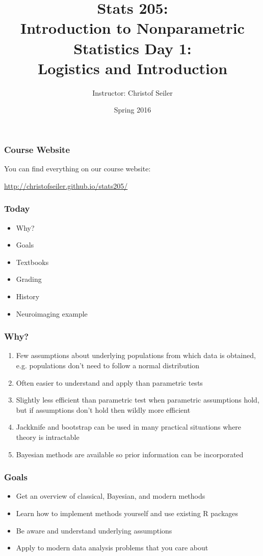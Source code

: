 \documentclass[10pt]{beamer}
\title{\large \bfseries Stats 205: \\ Introduction to Nonparametric Statistics \linebreak \linebreak \linebreak
Day 1: \\ Logistics and Introduction}
\author{Instructor: Christof Seiler}
\date{Spring 2016}
\begin{document}
\frame{
\thispagestyle{empty}
\titlepage
}

\begin{frame}
\frametitle{Course Website}

You can find everything on our course website: \linebreak

\url{http://christofseiler.github.io/stats205/}

\end{frame}

\begin{frame}
\frametitle{Today}

\begin{itemize}
\item Why?
\item Goals
\item Textbooks
\item Grading
\item History
\item Neuroimaging example
\end{itemize}

\end{frame}

\begin{frame}
\frametitle{Why?}

\begin{enumerate}
\item Few assumptions about underlying populations from which data is obtained, e.g. populations don't need to follow a normal distribution
\item Often easier to understand and apply than parametric tests
\item Slightly less efficient than parametric test when parametric assumptions hold, but if assumptions don't hold then wildly more efficient
\item Jackknife and bootstrap can be used in many practical situations where theory is intractable
\item Bayesian methods are available so prior information can be incorporated
\end{enumerate}

\end{frame}

\begin{frame}
\frametitle{Goals}

\begin{itemize}
\item Get an overview of classical, Bayesian, and modern methods
\item Learn how to implement methods yourself and use existing R packages
\item Be aware and understand underlying assumptions
\item Apply to modern data analysis problems that you care about
\end{itemize}

\end{frame}
\end{document}
